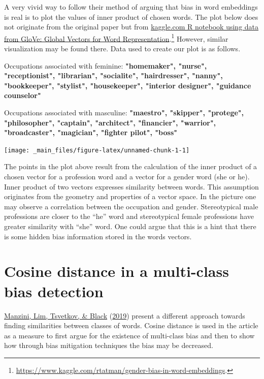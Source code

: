 \documentclass[
  12pt,
]{book}
\begin{document}
A very vivid way to follow their method of arguing that bias in word embeddings is real is to plot the values of inner product of chosen words. The plot below does not originate from the original paper but from \href{https://www.kaggle.com/rtatman/gender-bias-in-word-embeddings}{kaggle.com R notebook using data from GloVe: Global Vectors for Word Representation}.\footnote{\url{https://www.kaggle.com/rtatman/gender-bias-in-word-embeddings}.} However, similar visualization may be found there. Data used to create our plot is as follows.

Occupations associated with feminine: \textbf{"homemaker", "nurse", "receptionist", "librarian", "socialite", "hairdresser", "nanny", "bookkeeper", "stylist", "housekeeper", "interior designer", "guidance counselor"}

Occupations associated with masculine: \textbf{"maestro", "skipper", "protege", "philosopher", "captain", "architect", "financier", "warrior", "broadcaster", "magician", "fighter pilot", "boss"}

\vspace{1mm}
\footnotesize

\begin{center}\texttt{[image: \_main\_files/figure-latex/unnamed-chunk-1-1]} \end{center}
\normalsize

The points in the plot above result from the calculation of the inner product of a chosen vector for a profession word and a vector for a gender word (she or he). Inner product of two vectors expresses similarity between words. This assumption originates from the geometry and properties of a vector space. In the picture one may observe a correlation between the occupation and gender. Stereotypical male professions are closer to the ``he'' word and stereotypical female professions have greater similarity with ``she'' word. One could argue that this is a hint that there is some hidden bias information stored in the words vectors.

\hypertarget{cosine-distance-in-a-multi-class-bias-detection}{%
\section{Cosine distance in a multi-class bias detection}\label{cosine-distance-in-a-multi-class-bias-detection}}

\protect\hyperlink{ref-Manzini2019blackToCriminal}{Manzini, Lim, Tsvetkov, \& Black} (\protect\hyperlink{ref-Manzini2019blackToCriminal}{2019}) present a different approach towards finding similarities between classes of words. Cosine distance is used in the article as a measure to first argue for the existence of multi-class bias and then to show how through bias mitigation techniques the bias may be decreased.
\end{document}
